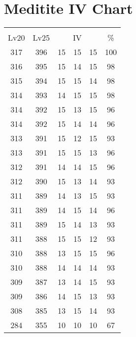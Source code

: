 \documentclass{article}%
\begin{document}
%
\normalsize%
\section{Meditite IV Chart}%
\label{sec:Meditite IV Chart}%
\renewcommand{\arraystretch}{1.5}%
\begin{tabular}{|c|c|c|c|c|c|}%
\hline%
\multicolumn{6}{|c|}{\textcolor{white}{ 
\linebreak{Meditite}
}%
\cellcolor{black}}\\%
\multicolumn{1}{|c}{Lv20}&\multicolumn{1}{c|}{Lv25}&\multicolumn{3}{c|}{IV}&\multicolumn{1}{|c|}{\%}\\%
\hline%
\rowcolor{color100}%
317&396&15&15&15&100\\%
\hline%
\rowcolor{color98}%
316&395&15&14&15&98\\%
\hline%
\rowcolor{color98}%
315&394&15&15&14&98\\%
\hline%
\rowcolor{color98}%
314&393&14&15&15&98\\%
\hline%
\rowcolor{color96}%
314&392&15&13&15&96\\%
\hline%
\rowcolor{color96}%
314&392&15&14&14&96\\%
\hline%
\rowcolor{color93}%
313&391&15&12&15&93\\%
\hline%
\rowcolor{color96}%
313&391&15&15&13&96\\%
\hline%
\rowcolor{color96}%
312&391&14&14&15&96\\%
\hline%
\rowcolor{color93}%
312&390&15&13&14&93\\%
\hline%
\rowcolor{color93}%
311&389&14&13&15&93\\%
\hline%
\rowcolor{color96}%
311&389&14&15&14&96\\%
\hline%
\rowcolor{color93}%
311&389&15&14&13&93\\%
\hline%
\rowcolor{color93}%
311&388&15&15&12&93\\%
\hline%
\rowcolor{color96}%
310&388&13&15&15&96\\%
\hline%
\rowcolor{color93}%
310&388&14&14&14&93\\%
\hline%
\rowcolor{color93}%
309&387&13&14&15&93\\%
\hline%
\rowcolor{color93}%
309&386&14&15&13&93\\%
\hline%
\rowcolor{color93}%
308&385&13&15&14&93\\%
\hline%
\rowcolor{color91}%
284&355&10&10&10&67\\%
\end{tabular}

%
\end{document}
